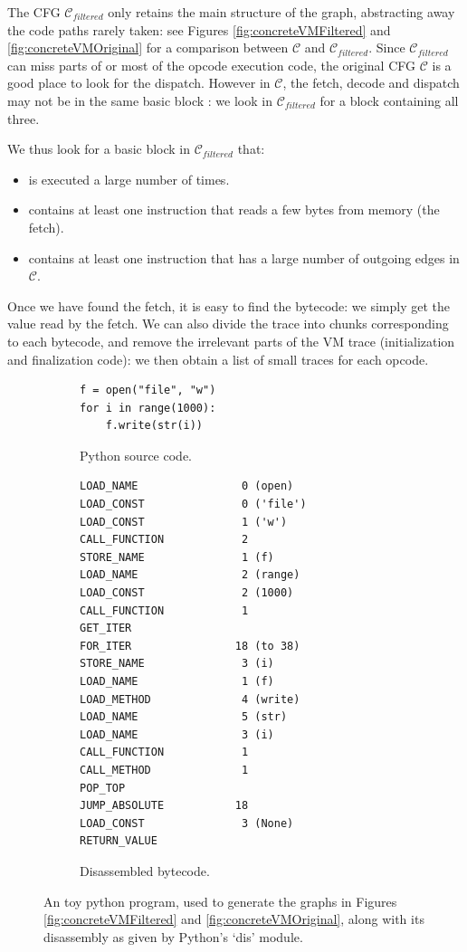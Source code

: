 \documentclass[english]{article}
\begin{document}
The CFG $\mathcal{C}_{filtered}$ only retains the main structure of the graph, abstracting away the code paths rarely taken: see Figures \ref{fig:concreteVMFiltered} and \ref{fig:concreteVMOriginal} for a comparison between $\mathcal{C}$ and $\mathcal{C}_{filtered}$. Since $\mathcal{C}_{filtered}$ can miss parts of or most of the opcode execution code, the original CFG $\mathcal{C}$ is a good place to look for the dispatch. However in $\mathcal{C}$, the fetch, decode and dispatch may not be in the same basic block : we look in $\mathcal{C}_{filtered}$ for a block containing all three.

We thus look for a basic block in $\mathcal{C}_{filtered}$ that:
\begin{itemize}
	\item is executed a large number of times.
	\item contains at least one instruction that reads a few bytes from memory (the fetch).
	\item contains at least one instruction that has a large number of outgoing edges in $\mathcal{C}$.
\end{itemize}

Once we have found the fetch, it is easy to find the bytecode: we simply get the value read by the fetch. We can also divide the trace into chunks corresponding to each bytecode, and remove the irrelevant parts of the VM trace (initialization and finalization code): we then obtain a list of small traces for each opcode.

\begin{figure}[htp]
	\centering 
	\begin{subfigure}{.5\textwidth}
		\centering 	
		\begin{BVerbatim}
f = open("file", "w")
for i in range(1000):
	f.write(str(i))
		\end{BVerbatim}
		\caption{Python source code.}
		\label{fig:examplePythonProg:source}
	\end{subfigure}%
	\begin{subfigure}{.5\textwidth}
		\centering 	
		\begin{BVerbatim}
LOAD_NAME                0 (open)
LOAD_CONST               0 ('file')
LOAD_CONST               1 ('w')
CALL_FUNCTION            2
STORE_NAME               1 (f)
LOAD_NAME                2 (range)
LOAD_CONST               2 (1000)
CALL_FUNCTION            1
GET_ITER
FOR_ITER                18 (to 38)
STORE_NAME               3 (i)
LOAD_NAME                1 (f)
LOAD_METHOD              4 (write)
LOAD_NAME                5 (str)
LOAD_NAME                3 (i)
CALL_FUNCTION            1
CALL_METHOD              1
POP_TOP
JUMP_ABSOLUTE           18
LOAD_CONST               3 (None)
RETURN_VALUE
		\end{BVerbatim}
		\caption{Disassembled bytecode.}
		\label{fig:examplePythonProg:bytecode}
	\end{subfigure}
	\caption{An toy python program, used to generate the graphs in Figures 	\ref{fig:concreteVMFiltered} and \ref{fig:concreteVMOriginal}, along with its disassembly as given by Python's `dis' module.}
	\label{fig:examplePythonProg}
\end{figure}
\end{document}
